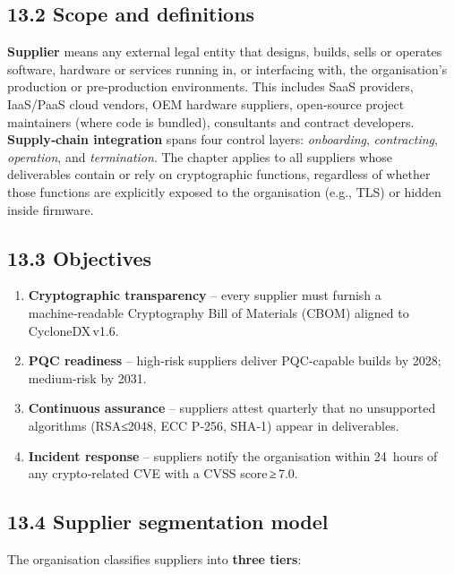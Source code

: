 \documentclass[
  english,
]{article}
\providecommand{\tightlist}{%
  \setlength{\itemsep}{0pt}\setlength{\parskip}{0pt}}
\begin{document}
\subsection{13.2 Scope and definitions}\label{scope-and-definitions}

\textbf{Supplier} means any external legal entity that designs, builds,
sells or operates software, hardware or services running in, or
interfacing with, the organisation's production or pre‑production
environments. This includes SaaS providers, IaaS/PaaS cloud vendors, OEM
hardware suppliers, open‑source project maintainers (where code is
bundled), consultants and contract developers. \textbf{Supply‑chain
integration} spans four control layers: \emph{onboarding},
\emph{contracting}, \emph{operation}, and \emph{termination}. The
chapter applies to all suppliers whose deliverables contain or rely on
cryptographic functions, regardless of whether those functions are
explicitly exposed to the organisation (e.g., TLS) or hidden inside
firmware.

\subsection{13.3 Objectives}\label{objectives}

\begin{enumerate}
\def\labelenumi{\arabic{enumi}.}
\tightlist
\item
  \textbf{Cryptographic transparency} -- every supplier must furnish a
  machine‑readable Cryptography Bill of Materials (CBOM) aligned to
  CycloneDX\,v1.6.
\item
  \textbf{PQC readiness} -- high‑risk suppliers deliver PQC‑capable
  builds by 2028; medium‑risk by 2031.
\item
  \textbf{Continuous assurance} -- suppliers attest quarterly that no
  unsupported algorithms (RSA≤2048, ECC P‑256, SHA‑1) appear in
  deliverables.
\item
  \textbf{Incident response} -- suppliers notify the organisation within
  24~hours of any crypto‑related CVE with a CVSS score\,≥\,7.0.
\end{enumerate}

\subsection{13.4 Supplier segmentation
model}\label{supplier-segmentation-model}

The organisation classifies suppliers into \textbf{three tiers}:
\end{document}
